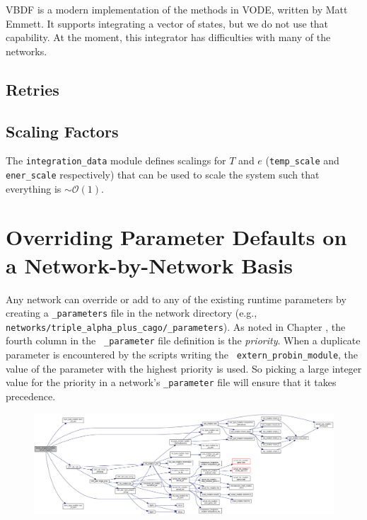 VBDF is a modern implementation of the methods in VODE, written by
Matt Emmett.  It supports integrating a vector of states, but we do
not use that capability.  At the moment, this integrator has
difficulties with many of the networks.


\subsection{Retries}


\subsection{Scaling Factors}

The {\tt integration\_data} module defines scalings for $T$ and $e$
({\tt temp\_scale} and {\tt ener\_scale} respectively) that can be
used to scale the system such that everything is $\sim
\mathcal{O}(1)$.  


\section{Overriding Parameter Defaults on a Network-by-Network Basis}

Any network can override or add to any of the existing runtime
parameters by creating a {\tt \_parameters} file in the network
directory (e.g., {\tt
  networks/triple\_alpha\_plus\_cago/\_parameters}).  As noted in
Chapter \label{chapter:parameters}, the fourth column in the {\tt
  \_parameter} file definition is the {\em priority}.  When a
duplicate parameter is encountered by the scripts writing the {\tt
  extern\_probin\_module}, the value of the parameter with the highest
priority is used.  So picking a large integer value for the priority
in a network's {\tt \_parameter} file will ensure that it takes
precedence.


\begin{figure}
\centering
\includegraphics[width=\linewidth]{doxygen_network}
\end{figure}
